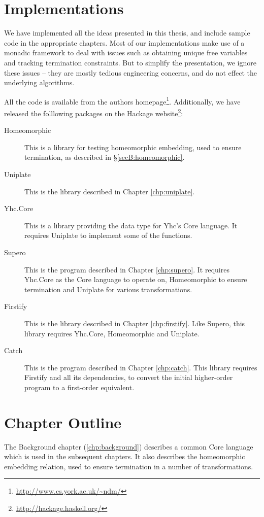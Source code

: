 \section{Implementations}

We have implemented all the ideas presented in this thesis, and include sample code in the appropriate chapters. Most of our implementations make use of a monadic framework to deal with issues such as obtaining unique free variables and tracking termination constraints. But to simplify the presentation, we ignore these issues -- they are mostly tedious engineering concerns, and do not effect the underlying algorithms.

All the code is available from the authors homepage\footnote{\url{http://www.cs.york.ac.uk/~ndm/}}. Additionally, we have released the folllowing packages on the Hackage website\footnote{\url{http://hackage.haskell.org/}}:

\begin{description}
\item[Homeomorphic] This is a library for testing homeomorphic embedding, used to ensure termination, as described in \S\ref{secB:homeomorphic}.
\item[Uniplate] This is the library described in Chapter \ref{chp:uniplate}.
\item[Yhc.Core] This is a library providing the data type for Yhc's Core language. It requires Uniplate to implement some of the functions.
\item[Supero] This is the program described in Chapter \ref{chp:supero}. It requires Yhc.Core as the Core language to operate on, Homeomorphic to ensure termination and Uniplate for various transformations.
\item[Firstify] This is the library described in Chapter \ref{chp:firstify}. Like Supero, this library requires Yhc.Core, Homeomorphic and Uniplate.
\item[Catch] This is the program described in Chapter \ref{chp:catch}. This library requires Firstify and all its dependencies, to convert the initial higher-order program to a first-order equivalent.
\end{description}

\section{Chapter Outline}

The Background chapter (\ref{chp:background}) describes a common Core language which is used in the subsequent chapters. It also describes the homeomorphic embedding relation, used to ensure termination in a number of transformations.

